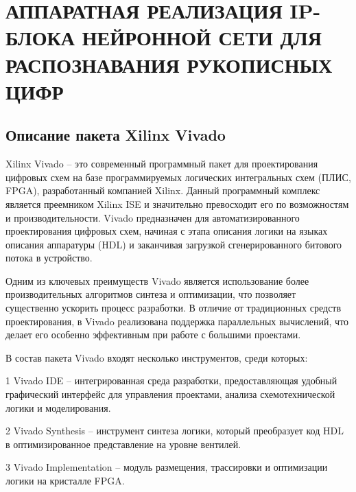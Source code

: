\chapter[Аппаратная реализация IP-блока нейронной сети для распознавания рукописных цифр]
{АППАРАТНАЯ РЕАЛИЗАЦИЯ IP-БЛОКА НЕЙРОННОЙ СЕТИ ДЛЯ РАСПОЗНАВАНИЯ РУКОПИСНЫХ ЦИФР}

\section{Описание пакета Xilinx Vivado}
\hspace*{12.5 mm}Xilinx Vivado – это современный программный пакет для 
проектирования цифровых схем на базе программируемых логических интегральных 
схем (ПЛИС, FPGA), разработанный компанией Xilinx. Данный программный комплекс 
является преемником Xilinx ISE и значительно превосходит его по возможностям и 
производительности. Vivado предназначен для автоматизированного проектирования 
цифровых схем, начиная с этапа описания логики на языках описания аппаратуры 
(HDL) и заканчивая загрузкой сгенерированного битового потока в 
устройство\cite{XilinxUG}.  

Одним из ключевых преимуществ Vivado является использование более 
производительных алгоритмов синтеза и оптимизации, что позволяет существенно 
ускорить процесс разработки. В отличие от традиционных средств проектирования, 
в Vivado реализована поддержка параллельных вычислений, что делает его особенно
эффективным при работе с большими проектами.  

В состав пакета Vivado входят несколько инструментов, среди 
которых\cite{XilinxUG}:  

  1 {Vivado IDE} – интегрированная среда разработки, предоставляющая удобный 
графический интерфейс для управления проектами, анализа схемотехнической логики
и моделирования.

  2 {Vivado Synthesis} – инструмент синтеза логики, который преобразует код HDL
в оптимизированное представление на уровне вентилей.

  3 {Vivado Implementation} – модуль размещения, трассировки и оптимизации 
логики на кристалле FPGA.\@

